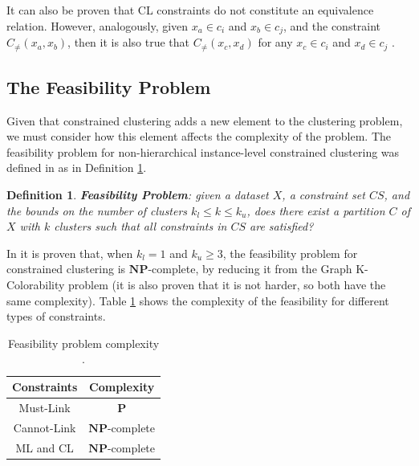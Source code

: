 \documentclass[review]{elsarticle}
\newtheorem{definition}{Definition}
\begin{document}
It can also be proven that CL constraints do not constitute an equivalence relation. However, analogously, given $x_a \in c_i$ and $x_b \in c_j$, and the constraint $C_{\neq}(x_a,x_b)$, then it is also true that $C_{\neq}(x_c,x_d)$ for any $x_c \in c_i$ and $x_d \in c_j$ \cite{davidson2007survey}.

\subsection{The Feasibility Problem} \label{sec:BackFeas}

Given that constrained clustering adds a new element to the clustering problem, we must consider how this element affects the complexity of the problem. The feasibility problem for non-hierarchical instance-level constrained clustering was defined in \cite{davidson2005clustering} as in Definition \ref{def1}.

\begin{definition}

	\textbf{Feasibility Problem}: given a dataset $X$, a constraint set $CS$, and the bounds on the number of clusters $k_l \leq k \leq k_u$, does there exist a partition $C$ of $X$ with $k$ clusters such that all constraints in $CS$ are satisfied? \cite{davidson2005clustering}
	\label{def1}

\end{definition}

In \cite{davidson2005clustering} it is proven that, when $k_l = 1$ and $k_u \ge 3$, the feasibility problem for constrained clustering is $\mathbf{NP}$-complete, by reducing it from the Graph K-Colorability problem (it is also proven that it is not harder, so both have the same complexity). Table \ref{tab:feasibility} shows the complexity of the feasibility for different types of constraints.

\begin{table}[!h]
	\centering
	\setlength{\tabcolsep}{7pt}
	\renewcommand{\arraystretch}{1.2}
		\begin{tabular}{c c}
			\hline
			Constraints & Complexity \\
			\hline
			Must-Link & $\mathbf{P}$\\
			Cannot-Link & $\mathbf{NP}$-complete\\
			ML and CL & $\mathbf{NP}$-complete\\
			\hline

		\end{tabular}%
	\caption{Feasibility problem complexity \cite{davidson2005clustering}.}
	\label{tab:feasibility}
\end{table}
\end{document}

